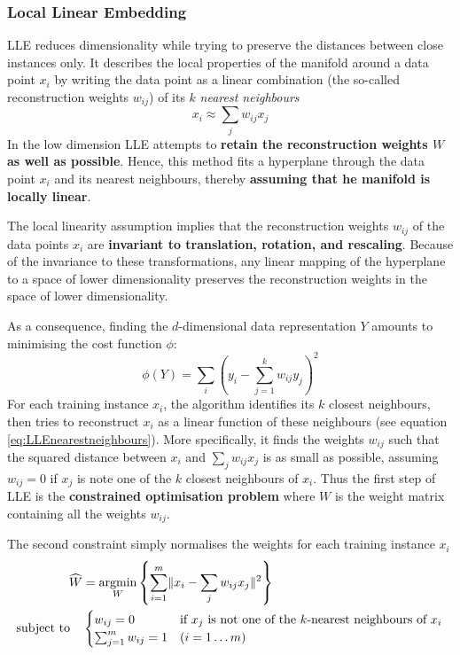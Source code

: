 \documentclass[11pt]{article}
\theoremstyle{definition}
\newcommand*\argmin[1]{\underset{#1}{\text{argmin}}}
\DeclarePairedDelimiter\norm{\lVert}{\rVert}
\begin{document}
\subsubsection{Local Linear Embedding}
LLE reduces dimensionality while trying to preserve the distances between close instances only. It describes the local properties of the manifold around a data point $x_i$ by writing the data point as a linear combination (the so-called reconstruction weights $w_{ij}$) of its $k$ \emph{nearest neighbours}
\begin{equation}
	x_i \approx \sum_j w_{ij} x_j
	\label{eq:LLEnearestneighbours}
\end{equation}
In the low dimension LLE attempts to \textbf{retain the reconstruction weights $W$ as well as possible}. Hence, this method fits a hyperplane through the data point $x_i$ and its nearest neighbours, thereby \textbf{assuming that he manifold is locally linear}.

The local linearity assumption implies that the reconstruction weights $ w_{ij} $ of the data points $x_i$ are \textbf{invariant to translation, rotation, and rescaling}. Because of the invariance to these transformations, any linear mapping of the hyperplane to a space of lower dimensionality preserves the reconstruction weights in the space of lower dimensionality.

As a consequence, finding the $d$-dimensional data representation $Y$ amounts to minimising the cost function $\phi$:
\begin{equation*}
	\phi(Y) = \sum_{i}\left(y_i - \sum_{j=1}^{k}w_{ij}y_j\right)^2
\end{equation*}
For each training instance $x_i$, the algorithm identifies its $k$ closest neighbours, then tries to reconstruct $x_i$ as a linear function of these neighbours (see equation \ref{eq:LLEnearestneighbours}). More specifically, it finds the weights $w_{ij}$ such that the squared distance between $x_i$ and $\sum_j w_{ij} x_j$ is as small as possible, assuming $w_{ij} = 0$ if $x_j$ is note one of the $k$ closest neighbours of $x_i$. Thus the first step of LLE is the \textbf{constrained optimisation problem} where $W$ is the weight matrix containing all the weights $w_{ij}$.

The second constraint simply normalises the weights for each training instance $x_i$
\begin{align*}
	\widehat{W} &= \argmin{W}\left\{ \sum_{i=1}^{m}\norm{x_i - \sum_j w_{ij}x_j}^2 \right\}\\
	\text{subject to} \quad &\begin{cases}
	w_{ij} = 0 & \text{if $x_j$ is not one of the $k$-nearest neighbours of $x_i$}\\
	\sum_{j=1}^{m} w_{ij} = 1 & (i=1\dots m)
	\end{cases}
\end{align*}
\end{document}

